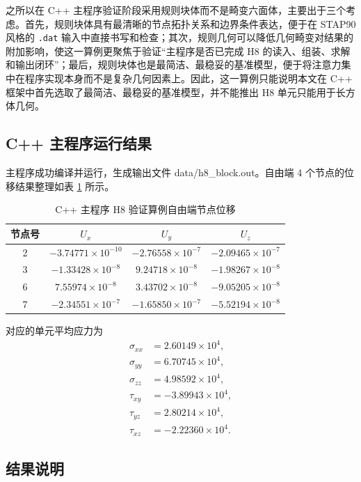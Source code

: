 \documentclass[12pt,a4paper]{article}
\begin{document}
之所以在 C++ 主程序验证阶段采用规则块体而不是畸变六面体，主要出于三个考虑。首先，规则块体具有最清晰的节点拓扑关系和边界条件表达，便于在 STAP90 风格的 \texttt{.dat} 输入中直接书写和检查；其次，规则几何可以降低几何畸变对结果的附加影响，使这一算例更聚焦于验证“主程序是否已完成 H8 的读入、组装、求解和输出闭环”；最后，规则块体也是最简洁、最稳妥的基准模型，便于将注意力集中在程序实现本身而不是复杂几何因素上。因此，这一算例只能说明本文在 C++ 框架中首先选取了最简洁、最稳妥的基准模型，并不能推出 H8 单元只能用于长方体几何。

\subsection{C++ 主程序运行结果}

主程序成功编译并运行，生成输出文件 data/h8\_block.out。自由端 4 个节点的位移结果整理如表 \ref{tab:cpp_h8_disp} 所示。

\begin{table}[htbp]
\centering
\caption{C++ 主程序 H8 验证算例自由端节点位移}
\label{tab:cpp_h8_disp}
\begin{tabular}{cccc}
\toprule
节点号 & $U_x$ & $U_y$ & $U_z$ \\
\midrule
2 & $-3.74771\times10^{-10}$ & $-2.76558\times10^{-7}$ & $-2.09465\times10^{-7}$ \\
3 & $-1.33428\times10^{-8}$ & $9.24718\times10^{-8}$ & $-1.98267\times10^{-8}$ \\
6 & $7.55974\times10^{-8}$ & $3.43702\times10^{-8}$ & $-9.05205\times10^{-8}$ \\
7 & $-2.34551\times10^{-7}$ & $-1.65850\times10^{-7}$ & $-5.52194\times10^{-8}$ \\
\bottomrule
\end{tabular}
\end{table}

对应的单元平均应力为
\begin{align}
\sigma_{xx} &= 2.60149\times10^4, \\
\sigma_{yy} &= 6.70745\times10^4, \\
\sigma_{zz} &= 4.98592\times10^4, \\
\tau_{xy} &= -3.89943\times10^4, \\
\tau_{yz} &= 2.80214\times10^4, \\
\tau_{xz} &= -2.22360\times10^4.
\end{align}

\subsection{结果说明}
\end{document}
